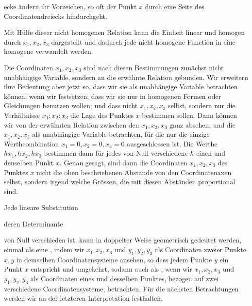 ecke ändern ihr Vorzeichen, so oft der Punkt $x$ durch eine Seite
des Coordinatendreiecks hindurchgeht.

Mit Hülfe dieser nicht homogenen Relation kann die Einheit
linear und homogen durch $x_1, x_2, x_3$ dargestellt und dadurch
jede nicht homogene Function in eine homogene verwandelt
werden.

Die Coordinaten $x_1, x_2, x_3$ sind nach diesen Bestimmungen
zunächst nicht unabhängige Variable, sondern an die erwähnte
Relation gebunden. Wir erweitern ihre Bedeutung aber jetzt so,
dass wir sie als unabhängige Variable betrachten können, wenn
wir festsetzen, dass wir sie nur in homogenen Formen oder
Gleichungen benutzen wollen;
und dass nicht $x_1, x_2, x_3$ selbst,
sondern nur die Verhältnisse $x_1 : x_2 : x_3$ die Lage des Punktes $x$
bestimmen sollen. Dann können wir von der erwähnten Relation
zwischen den $x_1, x_2, x_3$ ganz absehen, und die $x_1, x_2, x_3$ als unabhängige Variable betrachten, für die nur die einzige Werthcombination $x_1 = 0, x_2 = 0, x_3 = 0$ ausgeschlossen ist. Die
Werthe $h x_1, h x_2, h x_3$ bestimmen dann für jedes von Null verschiedene $h$ einen und denselben Punkt $x$. Genau gesagt, sind
dann die Coordinaten $x_1, x_2, x_3$ des Punktes $x$ nicht die oben
beschriebenen Abstände von den Coordinatenaxen selbst, sondern irgend welche Grössen, die mit diesen Abständen proportional sind.

Jede lineare Substitution


\noindent deren Determinante


\noindent von Null verschieden ist, kann in doppelter Weise geometrisch
gedeutet werden, einmal als eine , indem wir $x_1, x_2, x_3$
und $y_1, y_2, y_3$ als Coordinaten zweier Punkte $x, y$ in demselben
Coordinatensysteme ansehen, so dass jedem Punkte $y$ ein Punkt $x$
entspricht und umgekehrt, sodann auch als , wenn wir $x_1, x_2, x_3$ und $y_1, y_2, y_3$ als Coordinaten eines und desselben Punktes, bezogen auf zwei verschiedene
Coordinatensysteme, betrachten. Für die nächsten Betrachtungen
werden wir an der letzteren Interpretation festhalten.

